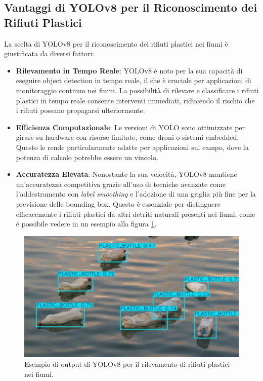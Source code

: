 \subsection*{Vantaggi di YOLOv8 per il Riconoscimento dei Rifiuti Plastici}

La scelta di YOLOv8 per il riconoscimento dei rifiuti plastici nei fiumi è giustificata da diversi fattori:

\begin{itemize}
    \item \textbf{Rilevamento in Tempo Reale}: YOLOv8 è noto per la sua capacità di eseguire object detection in tempo reale, il che è cruciale per applicazioni di monitoraggio continuo nei fiumi. La possibilità di rilevare e classificare i rifiuti plastici in tempo reale consente interventi immediati, riducendo il rischio che i rifiuti possano propagarsi ulteriormente.
    
    \item \textbf{Efficienza Computazionale}: Le versioni di YOLO sono ottimizzate per girare su hardware con risorse limitate, come droni o sistemi embedded. Questo le rende particolarmente adatte per applicazioni sul campo, dove la potenza di calcolo potrebbe essere un vincolo.
    
    \item \textbf{Accuratezza Elevata}: Nonostante la sua velocità, YOLOv8 mantiene un'accuratezza competitiva grazie all'uso di tecniche avanzate come l'addestramento con \textit{label smoothing} e l'adozione di una griglia più fine per la previsione delle bounding box. Questo è essenziale per distinguere efficacemente i rifiuti plastici da altri detriti naturali presenti nei fiumi, come è possibile vedere in un esempio alla figura \ref*{fig:3}.
\end{itemize}

\begin{figure}[h!]
    \centering
    \includegraphics[width=\textwidth]{res_1203_1.jpg} 
    \caption{Esempio di output di YOLOv8 per il rilevamento di rifiuti plastici nei fiumi.}
    \label{fig:3}
\end{figure}
